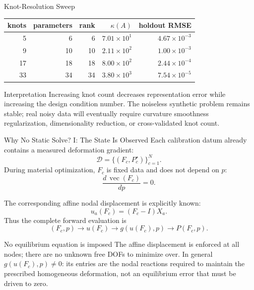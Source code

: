 \documentclass[aspectratio=169,10pt]{beamer}
\newcommand{\vect}[1]{\operatorname{vec}\!\left(#1\right)}
\begin{document}
\begin{frame}{Knot-Resolution Sweep}
  \small
  \begin{table}
    \centering
    \begin{tabular}{rrrrr}
      \toprule
      knots & parameters & rank & $\kappa(A)$ & holdout RMSE \\
      \midrule
      5  & 6  & 6  & $7.01\times10^1$ & $4.67\times10^{-3}$ \\
      9  & 10 & 10 & $2.11\times10^2$ & $1.00\times10^{-3}$ \\
      17 & 18 & 18 & $8.00\times10^2$ & $2.44\times10^{-4}$ \\
      33 & 34 & 34 & $3.80\times10^3$ & $7.54\times10^{-5}$ \\
      \bottomrule
    \end{tabular}
  \end{table}

  \vspace{0.8em}
  \begin{block}{Interpretation}
    Increasing knot count decreases representation error while increasing the
    design condition number. The noiseless synthetic problem remains stable;
    real noisy data will eventually require curvature smoothness
    regularization, dimensionality reduction, or cross-validated knot count.
  \end{block}
\end{frame}

\begin{frame}{Why No Static Solve? I: The State Is Observed}
  \small
  Each calibration datum already contains a measured deformation gradient:
  \[
    \mathcal D=\{(F_c,P_c^\star)\}_{c=1}^{N}.
  \]
  During material optimization, $F_c$ is fixed data and does not depend on
  $p$:
  \[
    \frac{d\,\vect{F_c}}{dp}=0.
  \]

  The corresponding affine nodal displacement is explicitly known:
  \[
    u_a(F_c)=(F_c-I)X_a.
  \]
  Thus the complete forward evaluation is
  \[
    (F_c,p)
    \longrightarrow
    u(F_c)
    \longrightarrow
    g(u(F_c),p)
    \longrightarrow
    P(F_c,p).
  \]

  \begin{alertblock}{No equilibrium equation is imposed}
    The affine displacement is enforced at all nodes; there are no unknown
    free DOFs to minimize over. In general $g(u(F_c),p)\ne0$: its entries are
    the nodal reactions required to maintain the prescribed homogeneous
    deformation, not an equilibrium error that must be driven to zero.
  \end{alertblock}
\end{frame}
\end{document}
